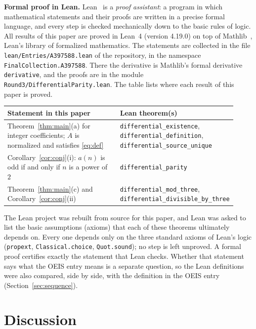 \documentclass[11pt,a4paper]{article}
\theoremstyle{definition}
\theoremstyle{remark}
\newcommand{\para}[1]{\par\medskip\noindent\textbf{#1}\enspace}
\begin{document}
\para{Formal proof in Lean.}
Lean~\cite{lean} is a \emph{proof assistant}: a program in which mathematical statements and their proofs are written
in a precise formal language, and every step is checked mechanically down to the basic rules of logic. All results of
this paper are proved in Lean~4 (version 4.19.0) on top of Mathlib~\cite{mathlib}, Lean's library of formalized
mathematics. The statements are collected in the file \texttt{lean/Entries/A397588.lean} of the repository,
in the namespace \texttt{FinalCollection.A397588}. There the derivative is Mathlib's formal derivative \texttt{derivative}, and the proofs are in the module \texttt{Round3/DifferentialParity.lean}.
The table lists where each result of this paper is proved.
\begin{center}\small\renewcommand{\arraystretch}{1.25}
\begin{tabular}{>{\raggedright\arraybackslash}p{0.52\linewidth}>{\raggedright\arraybackslash}p{0.4\linewidth}}
\toprule
Statement in this paper & Lean theorem(s)\\
\midrule
Theorem~\ref{thm:main}(a) for integer coefficients; $A$ is normalized and satisfies \eqref{eq:def} & \texttt{differential\_\allowbreak{}existence}, \texttt{differential\_\allowbreak{}definition}, \texttt{differential\_\allowbreak{}source\_\allowbreak{}unique} \\
Corollary~\ref{cor:conj}(i): $a(n)$ is odd if and only if $n$ is a power of $2$ & \texttt{differential\_\allowbreak{}parity} \\
Theorem~\ref{thm:main}(c) and Corollary~\ref{cor:conj}(ii) & \texttt{differential\_\allowbreak{}mod\_\allowbreak{}three}, \texttt{differential\_\allowbreak{}divisible\_\allowbreak{}by\_\allowbreak{}three} \\
\bottomrule
\end{tabular}
\end{center}
The Lean project was rebuilt from source for this paper, and Lean was asked to list the basic assumptions (axioms)
that each of these theorems ultimately depends on. Every one depends only on the three standard axioms of Lean's logic
(\texttt{propext}, \texttt{Classical.choice}, \texttt{Quot.sound}); no step is left unproved. A formal proof certifies
exactly the statement that Lean checks. Whether that statement says what the OEIS entry means is a separate question,
so the Lean definitions were also compared, side by side, with the definition in the OEIS entry
(Section~\ref{sec:sequence}).

\section{Discussion}\label{sec:discussion}
\end{document}
